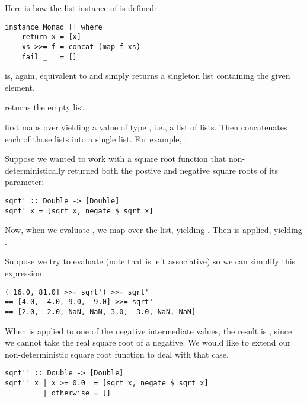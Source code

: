 Here is how the list instance of  is defined:

\begin{lstlisting}
instance Monad [] where  
    return x = [x]  
    xs >>= f = concat (map f xs)  
    fail _   = []  
\end{lstlisting}

\begin{notelist}
    \item {} is, again, equivalent to  and simply returns a singleton list containing the given element.
    \item {} returns the empty list.
    \item \code{(>>=)} first maps  over  yielding a value of type \code{[[a]]}, i.e., a list of lists.
          Then  concatenates each of those lists into a single list. For example,
          .
\end{notelist}

Suppose we wanted to work with a square root function that non-deterministically returned both the postive and negative
square roots of its parameter:

\begin{lstlisting}
sqrt' :: Double -> [Double]
sqrt' x = [sqrt x, negate $ sqrt x]
\end{lstlisting}

Now, when we evaluate , we map  over the list, yielding \code{[[2.0, -2.0], [3.0, -3.0]]}. 
Then  is applied, yielding \code{[2.0, -2.0, 3.0, -3.0]}.

Suppose we try to evaluate  (note that \code{(>>=)} is left associative) so we can simplify
this expression:

\begin{lstlisting}
([16.0, 81.0] >>= sqrt') >>= sqrt' 
== [4.0, -4.0, 9.0, -9.0] >>= sqrt'
== [2.0, -2.0, NaN, NaN, 3.0, -3.0, NaN, NaN]
\end{lstlisting}

When  is applied to one of the negative intermediate values, the result is , since we cannot take the
real square root of a negative. We would like to extend our non-deterministic square root function to deal with that case.

\begin{lstlisting}
sqrt'' :: Double -> [Double]
sqrt'' x | x >= 0.0  = [sqrt x, negate $ sqrt x]
         | otherwise = []
\end{lstlisting}
 

